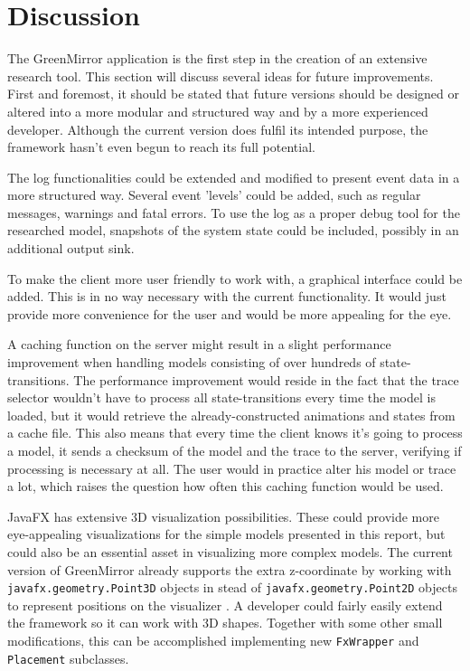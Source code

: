 \documentclass[a4paper]{article}
\begin{document}
\section{Discussion}\label{sec:discussion}
The GreenMirror application is the first step in the creation of an extensive research tool. This section will discuss several ideas for future improvements. First and foremost, it should be stated that future versions should be designed or altered into a more modular and structured way and by a more experienced developer. Although the current version does fulfil its intended purpose, the framework hasn't even begun to reach its full potential.

The log functionalities could be extended and modified to present event data in a more structured way. Several event 'levels' could be added, such as regular messages, warnings and fatal errors. To use the log as a proper debug tool for the researched model, snapshots of the system state could be included, possibly in an additional output sink.

To make the client more user friendly to work with, a graphical interface could be added. This is in no way necessary with the current functionality. It would just provide more convenience for the user and would be more appealing for the eye.

A caching function on the server might result in a slight performance improvement when handling models consisting of over hundreds of state-transitions. The performance improvement would reside in the fact that the trace selector wouldn't have to process all state-transitions every time the model is loaded, but it would retrieve the already-constructed animations and states from a cache file. This also means that every time the client knows it's going to process a model, it sends a checksum of the model and the trace to the server, verifying if processing is necessary at all. The user would in practice alter his model or trace a lot, which raises the question how often this caching function would be used.

JavaFX has extensive 3D visualization possibilities. These could provide more eye-appealing visualizations for the simple models presented in this report, but could also be an essential asset in visualizing more complex models. The current version of GreenMirror already supports the extra z-coordinate by working with \lstinline{javafx.geometry.Point3D} objects in stead of \lstinline{javafx.geometry.Point2D} objects to represent positions on the visualizer . A developer could fairly easily extend the framework so it can work with 3D shapes. Together with some other small modifications, this can be accomplished implementing new \lstinline{FxWrapper} and \lstinline{Placement} subclasses.
\end{document}
